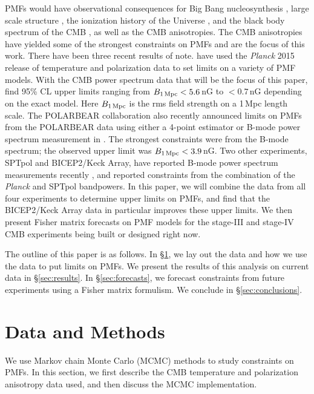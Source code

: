 \documentclass[apj]{emulateapj}
\newcommand{\bpmf}{\ensuremath{B_{\rm 1\,Mpc}}}
\newcommand{\planck}{{\sl Planck}}
\newcommand{\bicepkeck}{BICEP2/Keck Array}
\newcommand{\pb}{POLARBEAR}
\newcommand{\sptpol}{SPTpol}
\begin{document}
PMFs would have observational consequences for Big Bang nucleosynthesis \citep[e.g.,][]{kahniashvili10}, large scale structure \citep[e.g.,][]{battaner97}, the ionization history of the Universe \citep{kunze15}, and the black body spectrum of the CMB \citep[e.g.,][]{kunze14},  as well as the CMB anisotropies. 
The CMB anisotropies have yielded some of the strongest constraints on PMFs and are the focus of this work.
There have been three recent results of note. 
\citet{planck15-19} have used the \planck{} 2015 release of temperature and polarization data to set limits on a variety of PMF models. 
With the CMB power spectrum data that will be the focus of this paper, \citet{planck15-19} find 95\% CL upper limits ranging from $\bpmf < 5.6$\,nG to $<0.7$\,nG depending on the exact model. 
Here \bpmf{} is the rms field strength on a 1\,Mpc length scale. 
The \pb{} collaboration also recently announced limits on PMFs from the \pb{} data using either a 4-point estimator or B-mode power spectrum measurement in \citep{polarbear15}. 
The strongest constraints were from the B-mode spectrum; the observed upper limit was $\bpmf < 3.9$\,nG. 
Two other experiments, \sptpol{} and \bicepkeck{}, have reported B-mode power spectrum measurements recently \citep{keisler15,bicepkeck15}, 
and \citet{zucca16} reported constraints from the combination of the \planck{}  and \sptpol{} bandpowers. 
In this paper, we will combine the data from all four experiments to determine upper limits on PMFs, and find that the \bicepkeck{} data in particular improves these upper limits. 
We then present Fisher matrix forecasts on PMF models for the stage-III and stage-IV CMB experiments being built or designed right now. 



The outline of this paper is as follows. 
In \S\ref{sec:data}, we lay out the data and how we use the data to put limits on PMFs. 
We present the results of this analysis on current data in \S\ref{sec:results}. 
In \S\ref{sec:forecasts}, we forecast constraints from future experiments using a Fisher matrix formulism. 
We conclude in \S\ref{sec:conclusions}. 

\section{Data and Methods}
\label{sec:data}

We use  Markov chain Monte Carlo (MCMC) methods to study constraints on PMFs. 
In this section, we first describe the CMB temperature and polarization anisotropy data used, and then discuss the MCMC implementation. 
\end{document}
